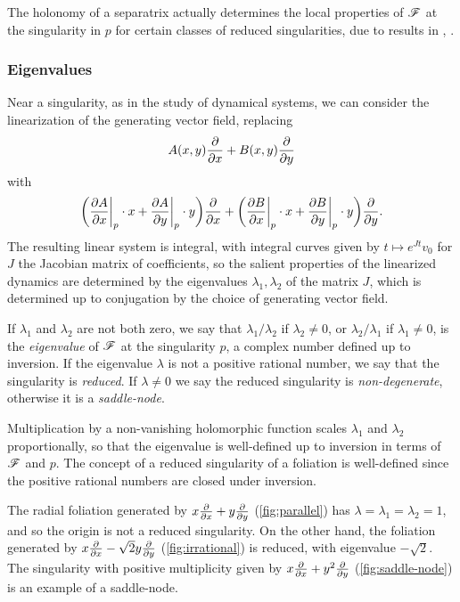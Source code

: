 The holonomy of a separatrix actually determines the local properties of $\mathscr{F}$
at the singularity in $p$ for certain classes of reduced singularities, due to
results in \cite{mattei_80}, \cite{martinet_82}.

\subsubsection{Eigenvalues}

Near a singularity, as in the study of dynamical systems, we can consider the
linearization of the generating vector field, replacing
\begin{equation*}
    A(x,y)\pdv{}{x} + B(x,y)\pdv{}{y}
\end{equation*}
with
\begin{equation*}
    \biggl(\pdv{A}{x}\bigg|_p\cdot x+\pdv{A}{y}\bigg|_p\cdot y\biggr)\pdv{}{x}
        + \biggl(\pdv{B}{x}\bigg|_p\cdot x+\pdv{B}{y}\bigg|_p\cdot y\biggr)
            \pdv{}{y}.
\end{equation*}
The resulting linear system is integral, with integral curves given by
$t\mapsto e^{Jt}v_0$ for $J$ the Jacobian matrix of coefficients, so the salient
properties of the linearized dynamics are determined by the eigenvalues
$\lambda_1,\lambda_2$ of the matrix $J$, which is determined up to conjugation
by the choice of generating vector field.

\begin{definition}
    If $\lambda_1$ and $\lambda_2$ are not both zero, we say that
    $\lambda_1/\lambda_2$ if $\lambda_2\ne0$, or $\lambda_2/\lambda_1$ if
    $\lambda_1\ne0$, is the \emph{eigenvalue} of $\mathscr{F}$ at the singularity $p$,
    a complex number defined up to inversion. If the eigenvalue $\lambda$ is not
    a positive rational number, we say that the singularity is \emph{reduced}.
    If $\lambda\ne0$ we say the reduced singularity is \emph{non-degenerate},
    otherwise it is a \emph{saddle-node}.
\end{definition}

\begin{remark}
    Multiplication by a non-vanishing holomorphic function scales $\lambda_1$
    and $\lambda_2$ proportionally, so that the eigenvalue is well-defined up to
    inversion in terms of $\mathscr{F}$ and $p$. The concept of a reduced singularity
    of a foliation is well-defined since the positive rational numbers are
    closed under inversion.
\end{remark}

\begin{example}
    The radial foliation generated by $x\pdv{}{x}+y\pdv{}{y}$
    (\cref{fig:parallel}) has $\lambda=\lambda_1=\lambda_2=1$, and so the origin
    is not a reduced singularity. On the other hand, the foliation generated by
    $x\pdv{}{x}-\sqrt2y\pdv{}{y}$ (\cref{fig:irrational}) is reduced, with
    eigenvalue $-\sqrt2$. The singularity with positive multiplicity given
    by $x\pdv{}{x}+y^2\pdv{}{y}$ (\cref{fig:saddle-node}) is an example of a
    saddle-node.
\end{example}


